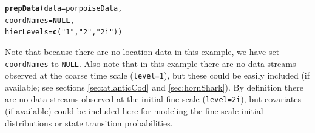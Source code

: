 \documentclass[12pt]{article}\usepackage[]{graphicx}\usepackage[]{xcolor}
\makeatletter
\newcommand{\hlsng}[1]{\textcolor[rgb]{0.192,0.494,0.8}{#1}}%
\newcommand{\hldef}[1]{\textcolor[rgb]{0.345,0.345,0.345}{#1}}%
\newcommand{\hlkwa}[1]{\textcolor[rgb]{0.161,0.373,0.58}{\textbf{#1}}}%
\newcommand{\hlkwc}[1]{\textcolor[rgb]{0.333,0.667,0.333}{#1}}%
\newcommand{\hlkwd}[1]{\textcolor[rgb]{0.737,0.353,0.396}{\textbf{#1}}}%
\newenvironment{kframe}{%
 \def\at@end@of@kframe{}%
 \ifinner\ifhmode%
  \def\at@end@of@kframe{\end{minipage}}%
  \begin{minipage}{\columnwidth}%
 \fi\fi%
 \def\FrameCommand##1{\hskip\@totalleftmargin \hskip-\fboxsep
 \colorbox{shadecolor}{##1}\hskip-\fboxsep
     \hskip-\linewidth \hskip-\@totalleftmargin \hskip\columnwidth}%
 \MakeFramed {\advance\hsize-\width
   \@totalleftmargin\z@ \linewidth\hsize
   \@setminipage}}%
 {\par\unskip\endMakeFramed%
 \at@end@of@kframe}
\newenvironment{knitrout}{}{} %
\makeatother
\begin{document}
\begin{knitrout}
\color{fgcolor}\begin{kframe}
\begin{alltt}
\hlkwd{prepData}\hldef{(}\hlkwc{data} \hldef{= porpoiseData,}
                \hlkwc{coordNames} \hldef{=} \hlkwa{NULL}\hldef{,}
                \hlkwc{hierLevels} \hldef{=} \hlkwd{c}\hldef{(}\hlsng{"1"}\hldef{,} \hlsng{"2"}\hldef{,} \hlsng{"2i"}\hldef{))}
\end{alltt}


{\ttfamily\noindent\bfseries\color{errorcolor}{\#\# Error in prepData.hierarchical(data = porpoiseData, coordNames = NULL, : hierLevels must be ordered factors of the form:\\\#\# \ \ \ \ \ '1', '2i', '2', ..., 'Mi', 'M' where M is the number of levels in the hierarchy}}\end{kframe}
\end{knitrout}
\noindent Note that because there are no location data in this example, we have set \verb|coordNames| to \verb|NULL|. Also note that in this example there are no data streams observed at the coarse time scale (\verb|level=1|), but these could be easily included (if available; see sections \ref{sec:atlanticCod} and \ref{sec:hornShark}). By definition there are no data streams observed at the initial fine scale (\verb|level=2i|), but covariates (if available) could be included here for modeling the fine-scale initial distributions or state transition probabilities.
\end{document}

